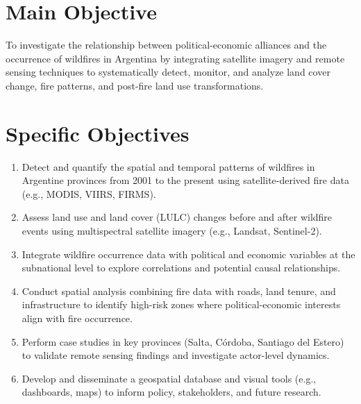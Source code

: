 \section{Main Objective}

To investigate the relationship between political-economic alliances and the occurrence of wildfires in Argentina by integrating satellite imagery and remote sensing techniques to systematically detect, monitor, and analyze land cover change, fire patterns, and post-fire land use transformations.

\section*{Specific Objectives}

\begin{enumerate}[label=\textbf{O\arabic*.}]
    \item Detect and quantify the spatial and temporal patterns of wildfires in Argentine provinces from 2001 to the present using satellite-derived fire data (e.g., MODIS, VIIRS, FIRMS).
    \item Assess land use and land cover (LULC) changes before and after wildfire events using multispectral satellite imagery (e.g., Landsat, Sentinel-2).
    \item Integrate wildfire occurrence data with political and economic variables at the subnational level to explore correlations and potential causal relationships.
    \item Conduct spatial analysis combining fire data with roads, land tenure, and infrastructure to identify high-risk zones where political-economic interests align with fire occurrence.
    \item Perform case studies in key provinces (Salta, Córdoba, Santiago del Estero) to validate remote sensing findings and investigate actor-level dynamics.
    \item Develop and disseminate a geospatial database and visual tools (e.g., dashboards, maps) to inform policy, stakeholders, and future research.
\end{enumerate}
